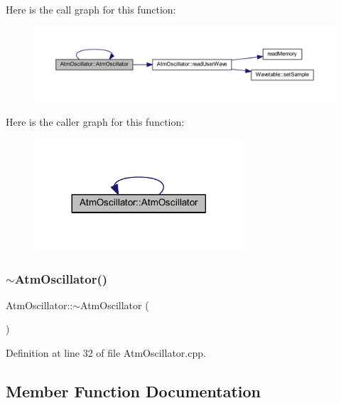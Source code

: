 Here is the call graph for this function\+:
\nopagebreak
\begin{figure}[H]
\begin{center}
\leavevmode
\includegraphics[width=350pt]{d8/d5f/class_atm_oscillator_a864b35c83864a6d5045f9dbb42fa862e_cgraph}
\end{center}
\end{figure}
Here is the caller graph for this function\+:
\nopagebreak
\begin{figure}[H]
\begin{center}
\leavevmode
\includegraphics[width=221pt]{d8/d5f/class_atm_oscillator_a864b35c83864a6d5045f9dbb42fa862e_icgraph}
\end{center}
\end{figure}
\mbox{\label{class_atm_oscillator_a3d5b959eff3a2cb4fa3200cadeb2ab0b}} 
\subsubsection{\texorpdfstring{$\sim$\+Atm\+Oscillator()}{~AtmOscillator()}}
{\footnotesize\ttfamily Atm\+Oscillator\+::$\sim$\+Atm\+Oscillator (\begin{DoxyParamCaption}{ }\end{DoxyParamCaption})}



Definition at line 32 of file Atm\+Oscillator.\+cpp.



\subsection{Member Function Documentation}
\mbox{\label{class_atm_oscillator_ab0b1ab90e227ced30ddffff96bec6427}} 
